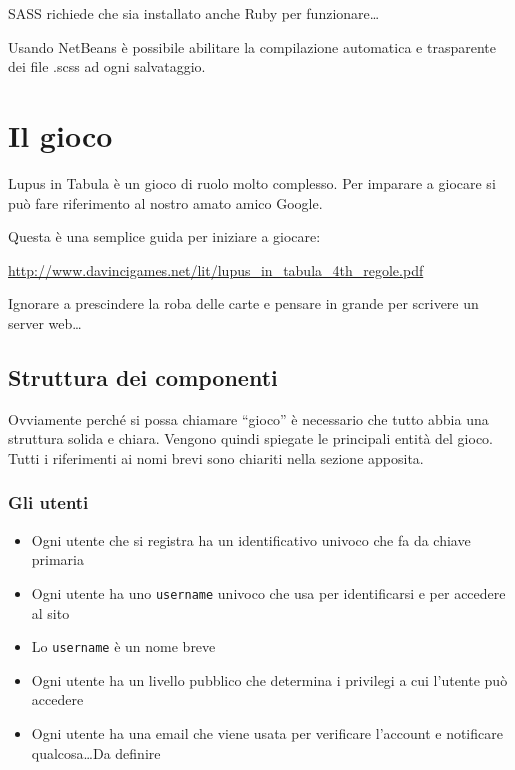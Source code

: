 \documentclass[10pt,a4paper]{article}
\begin{document}
SASS richiede che sia installato anche Ruby per funzionare\dots 

Usando NetBeans è possibile abilitare la compilazione automatica e trasparente dei file .scss ad ogni salvataggio.

\newpage

\section{Il gioco}
Lupus in Tabula è un gioco di ruolo molto complesso. Per imparare a giocare si può fare riferimento al nostro amato amico Google.

Questa è una semplice guida per iniziare a giocare:

\url{http://www.davincigames.net/lit/lupus_in_tabula_4th_regole.pdf}

Ignorare a prescindere la roba delle carte e pensare in grande per scrivere un server web\dots

\subsection{Struttura dei componenti}
Ovviamente perché si possa chiamare “gioco” è necessario che tutto abbia una struttura solida e chiara. Vengono quindi spiegate le principali entità del gioco. Tutti i riferimenti ai nomi brevi sono chiariti nella sezione apposita.

\subsubsection{Gli utenti}
\begin{itemize}
\item Ogni utente che si registra ha un identificativo univoco che fa da chiave primaria
\item Ogni utente ha uno \texttt{username} univoco che usa per identificarsi e per accedere al sito
\item Lo \texttt{username} è un nome breve
\item Ogni utente ha un livello pubblico che determina i privilegi a cui l'utente può accedere
\item Ogni utente ha una email che viene usata per verificare l'account e notificare qualcosa\dots Da definire
\end{itemize}
\end{document}
